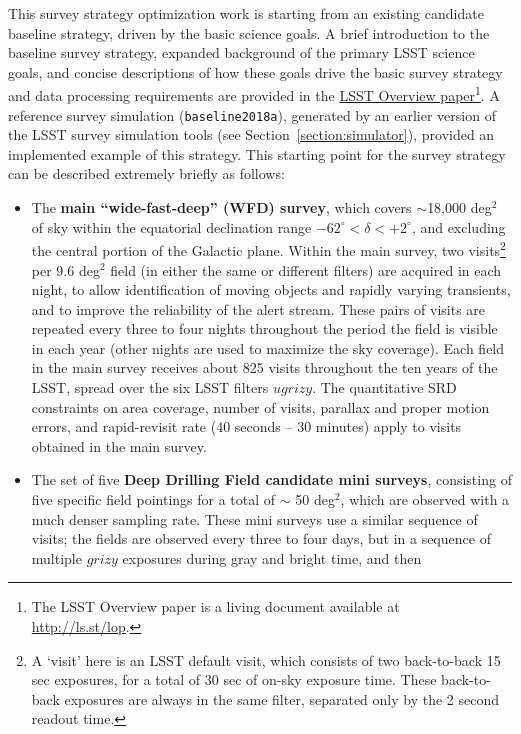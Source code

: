 This survey strategy optimization work is starting from an existing candidate baseline strategy, driven by the basic science goals. A brief introduction to the baseline survey strategy, expanded background of the primary LSST science goals, and concise descriptions of how these goals drive the basic survey strategy and data processing requirements are provided in the \href{http://ls.st/lop}{LSST Overview paper}\footnote{The LSST Overview paper is a living document available at \href{http://ls.st/lop}{http://ls.st/lop}.}. A reference survey simulation ({\tt baseline2018a}), generated by an earlier version of the LSST survey simulation tools (see Section~\ref{section:simulator}), provided an implemented example of this strategy. This starting point for the survey strategy can be described extremely briefly as follows:
\begin{itemize}
\item The {\bf main ``wide-fast-deep''  (WFD) survey}, which covers $\sim$18,000 deg$^2$ of sky within
the equatorial declination
range $-62^\circ < \delta < +2^\circ$, and excluding the central portion of the Galactic 
plane. Within the main survey, two visits\footnote{A `visit' here is an LSST default visit, which 
consists of two back-to-back 15 sec exposures, for a total of 30 sec of on-sky exposure time. These back-to-back exposures are always
in the same filter, separated only by the 2 second readout time.} 
per 9.6 deg$^2$ field (in either the same or different filters) are acquired in each night, to allow identification of moving objects and rapidly varying transients, and to improve
the reliability of the alert stream. These pairs of visits are repeated every three to four nights throughout the period the field is visible in each year (other nights are used to maximize the sky coverage). Each
field in the main survey receives about 825 visits throughout the ten years of the LSST, spread over the six LSST filters 
$ugrizy$. The quantitative SRD constraints on area coverage, number of visits, parallax and proper motion errors, and 
rapid-revisit rate (40 seconds -- 30 minutes) apply to visits obtained in the main survey. 
\item The set of five {\bf Deep Drilling Field candidate mini surveys}, consisting of five specific field pointings for a total of $\sim$ 50 deg$^2$, 
which are observed with a much denser sampling rate. These mini surveys use a similar sequence of visits; the fields
are observed every three to four days, but in a sequence of multiple $grizy$ exposures during gray and bright time, and then

\end{itemize}

